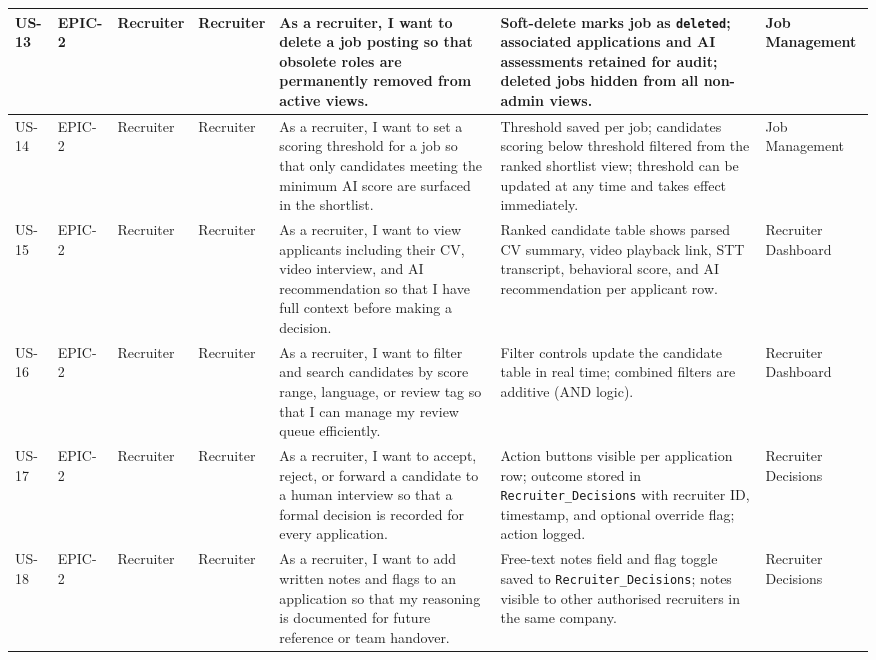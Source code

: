 \begin{longtable}{|p{0.8cm}|p{1.0cm}|p{1.2cm}|p{1.4cm}|p{4.2cm}|p{4.2cm}|p{1.8cm}|}
\rowcolor{nhRow2}
US-13 & EPIC-2 & Recruiter & Recruiter &
As a recruiter, I want to delete a job posting so that obsolete roles are permanently removed from active views. &
Soft-delete marks job as \texttt{deleted}; associated applications and AI assessments retained for audit; deleted jobs hidden from all non-admin views. & Job Management \\
\hline

\rowcolor{nhRow2}
US-14 & EPIC-2 & Recruiter & Recruiter &
As a recruiter, I want to set a scoring threshold for a job so that only candidates meeting the minimum AI score are surfaced in the shortlist. &
Threshold saved per job; candidates scoring below threshold filtered from the ranked shortlist view; threshold can be updated at any time and takes effect immediately. & Job Management \\
\hline

\rowcolor{nhRow2}
US-15 & EPIC-2 & Recruiter & Recruiter &
As a recruiter, I want to view applicants including their CV, video interview, and AI recommendation so that I have full context before making a decision. &
Ranked candidate table shows parsed CV summary, video playback link, STT transcript, behavioral score, and AI recommendation per applicant row. & Recruiter Dashboard \\
\hline

\rowcolor{nhRow2}
US-16 & EPIC-2 & Recruiter & Recruiter &
As a recruiter, I want to filter and search candidates by score range, language, or review tag so that I can manage my review queue efficiently. &
Filter controls update the candidate table in real time; combined filters are additive (AND logic). & Recruiter Dashboard \\
\hline

\rowcolor{nhRow2}
US-17 & EPIC-2 & Recruiter & Recruiter &
As a recruiter, I want to accept, reject, or forward a candidate to a human interview so that a formal decision is recorded for every application. &
Action buttons visible per application row; outcome stored in \texttt{Recruiter\_Decisions} with recruiter ID, timestamp, and optional override flag; action logged. & Recruiter Decisions \\
\hline

\rowcolor{nhRow2}
US-18 & EPIC-2 & Recruiter & Recruiter &
As a recruiter, I want to add written notes and flags to an application so that my reasoning is documented for future reference or team handover. &
Free-text notes field and flag toggle saved to \texttt{Recruiter\_Decisions}; notes visible to other authorised recruiters in the same company. & Recruiter Decisions \\
\hline


\end{longtable}
